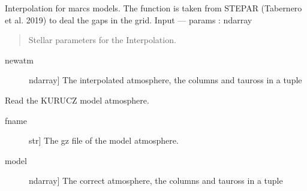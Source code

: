 \documentclass[letterpaper,10pt,english]{sphinxmanual}
\begin{document}

\begin{fulllineitems}
\label{\detokenize{index:FASMA.interpolation.interpolator_marcs}}
Interpolation for marcs models. The function is taken from STEPAR
(Tabernero et al. 2019) to deal the gaps in the grid.
Input
—\textendash{}
params : ndarray
\begin{quote}

Stellar parameters for the Interpolation.
\end{quote}
\begin{description}
\item[{newatm}] \leavevmode{[}ndarray{]}
The interpolated atmosphere, the columns and tauross in a tuple

\end{description}

\end{fulllineitems}


\begin{fulllineitems}
\label{\detokenize{index:FASMA.interpolation.read_model}}
Read the KURUCZ model atmosphere.
\begin{description}
\item[{fname}] \leavevmode{[}str{]}
The gz file of the model atmosphere.

\end{description}
\begin{description}
\item[{model}] \leavevmode{[}ndarray{]}
The correct atmosphere, the columns and tauross in a tuple

\end{description}

\end{fulllineitems}

\end{document}
